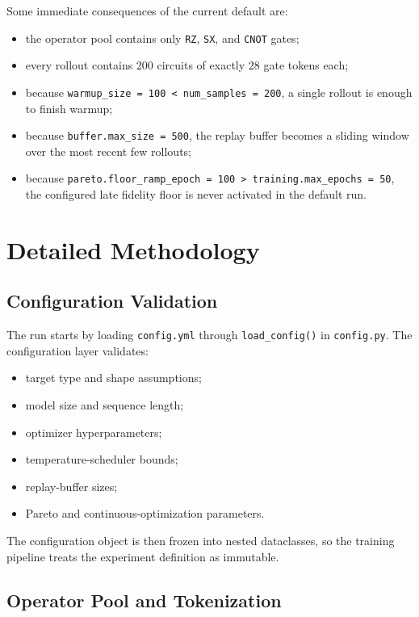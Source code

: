 \documentclass[11pt]{article}
\begin{document}
Some immediate consequences of the current default are:

\begin{itemize}[leftmargin=*]
\item the operator pool contains only \texttt{RZ}, \texttt{SX}, and \texttt{CNOT} gates;
\item every rollout contains $200$ circuits of exactly $28$ gate tokens each;
\item because \texttt{warmup\_size = 100 < num\_samples = 200}, a single rollout is enough to finish warmup;
\item because \texttt{buffer.max\_size = 500}, the replay buffer becomes a sliding window over the most recent few rollouts;
\item because \texttt{pareto.floor\_ramp\_epoch = 100 > training.max\_epochs = 50}, the configured late fidelity floor is never activated in the default run.
\end{itemize}

\section{Detailed Methodology}

\subsection{Configuration Validation}

The run starts by loading \texttt{config.yml} through \texttt{load\_config()} in \texttt{config.py}. The configuration layer validates:
\begin{itemize}[leftmargin=*]
\item target type and shape assumptions;
\item model size and sequence length;
\item optimizer hyperparameters;
\item temperature-scheduler bounds;
\item replay-buffer sizes;
\item Pareto and continuous-optimization parameters.
\end{itemize}

The configuration object is then frozen into nested dataclasses, so the training pipeline treats the experiment definition as immutable.

\subsection{Operator Pool and Tokenization}
\end{document}
